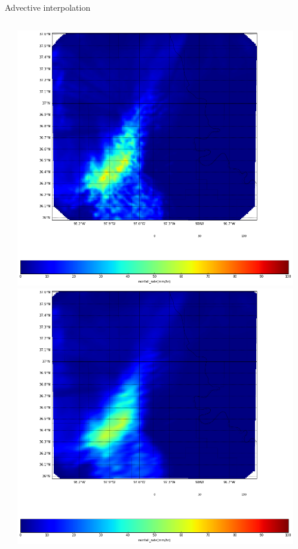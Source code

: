 \documentclass[final]{beamer}
\begin{document}
\begin{frame}{}
\begin{columns}[t]
\begin{column}{.3\linewidth}
    \end{column}
  \begin{column}{.3\linewidth}
  \vfill
   \begin{block}{Advective interpolation}
 	\begin{columns}[t]
		\begin{column}{.4\linewidth}
		\end{column}
                \begin{column}{.6\linewidth}
           		\includegraphics[width=1.0\linewidth]{figures/basic_accumulation.png}\\[1ex]     
            		\includegraphics[width=1.0\linewidth]{figures/advective_accum.png}\\[1ex]  
 		\end{column}
	\end{columns}
      \end{block}
   

\end{column}
\end{columns}
\end{frame}
\end{document}
